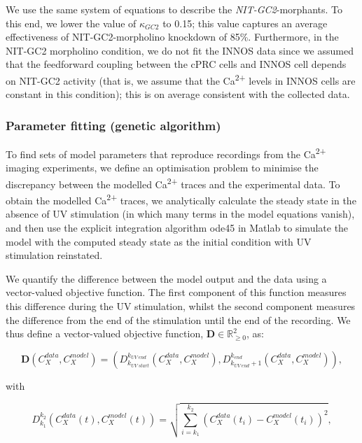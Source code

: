 \documentclass[
  11pt,
  letterpaper,
  DIV=11,
  numbers=noendperiod]{scrartcl}
\begin{document}
We use the same system of equations to describe the
\emph{NIT-GC2}-morphants. To this end, we lower the value of
\(\kappa_{GC2}\) to 0.15; this value captures an average effectiveness
of NIT-GC2-morpholino knockdown of 85\%. Furthermore, in the NIT-GC2
morpholino condition, we do not fit the INNOS data since we assumed that
the feedforward coupling between the cPRC cells and INNOS cell depends
on NIT-GC2 activity (that is, we assume that the Ca\textsuperscript{2+}
levels in INNOS cells are constant in this condition); this is on
average consistent with the collected data.

\subsubsection{Parameter fitting (genetic
algorithm)}\label{parameter-fitting-genetic-algorithm}

To find sets of model parameters that reproduce recordings from the
Ca\textsuperscript{2+} imaging experiments, we define an optimisation
problem to minimise the discrepancy between the modelled
Ca\textsuperscript{2+} traces and the experimental data. To obtain the
modelled Ca\textsuperscript{2+} traces, we analytically calculate the
steady state in the absence of UV stimulation (in which many terms in
the model equations vanish), and then use the explicit integration
algorithm ode45 in Matlab to simulate the model with the computed steady
state as the initial condition with UV stimulation reinstated.

We quantify the difference between the model output and the data using a
vector-valued objective function. The first component of this function
measures this difference during the UV stimulation, whilst the second
component measures the difference from the end of the stimulation until
the end of the recording. We thus define a vector-valued objective
function, \(\mathbf{D} \in \mathbb{R}^2_{\geq 0}\), as:

\begin{equation}
 \mathbf{D}\left({C}_X^{data},{C}_X^{model}\right)=\left(D_{k_{UV\: start}}^{k_{UV\: end}}\left({C}_X^{data},{C}_X^{model}\right),D_{k_{UV\: end }+1}^{k_{end}}\left({C}_X^{data},{C}_X^{model}\right) \right),
 \label{eq:cost_fun}
\end{equation} 

with

\begin{equation*}
 D_{k_1}^{k_2}\left({C}_X^{data}(t),{C}_X^{model}(t)\right)=\sqrt{\sum_{i=k_1}^{k_2}\left({C}_{X}^{data}(t_i)-{C}_{X}^{model}(t_i)\right)^2} ,   
\end{equation*}
\end{document}
